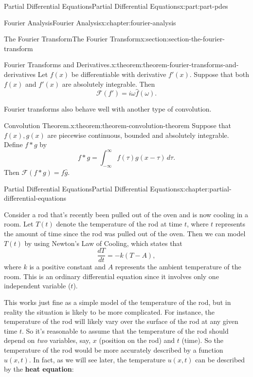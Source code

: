\documentclass[oneside,10pt,]{book}
\newcommand{\terminology}[1]{\textbf{#1}}
\numberwithin{equation}{part}
\begin{document}
\begin{partptx}{Partial Differential Equations}{}{Partial Differential Equations}{}{}{x:part:part-pdes}
\begin{chapterptx}{Fourier Analysis}{}{Fourier Analysis}{}{}{x:chapter:fourier-analysis}
\begin{sectionptx}{The Fourier Transform}{}{The Fourier Transform}{}{}{x:section:section-the-fourier-transform}
\begin{theorem}{Fourier Transforms and Derivatives.}{}{x:theorem:theorem-fourier-transforms-and-derivatives}
%
Let \(f(x)\) be differentiable with derivative \(f'(x)\). Suppose that both \(f(x)\) and \(f'(x)\) are absolutely integrable. Then%
\begin{equation*}
\mathcal{F}(f') = i\omega\hat{f}(\omega).
\end{equation*}
%
\end{theorem}
Fourier transforms also behave well with another type of convolution.%
\begin{theorem}{Convolution Theorem.}{}{x:theorem:theorem-convolution-theorem}%
%
Suppose that \(f(x),g(x)\) are piecewise continuous, bounded and absolutely integrable. Define \(f\ast g\) by%
\begin{equation*}
f\ast g = \int_{-\infty}^{\infty}f(\tau)g(x-\tau)\,d\tau.
\end{equation*}
Then \(\mathcal{F}(f\ast g) = \hat{f}\hat{g}.\)%
\end{theorem}
\end{sectionptx}
\end{chapterptx}
%
\typeout{************************************************}
\typeout{************************************************}
%
\begin{chapterptx}{Partial Differential Equations}{}{Partial Differential Equations}{}{}{x:chapter:partial-differential-equations}
\begin{introduction}{}%
Consider a rod that's recently been pulled out of the oven and is now cooling in a room. Let \(T(t)\) denote the temperature of the rod at time \(t\), where \(t\) represents the amount of time since the rod was pulled out of the oven. Then we can model \(T(t)\) by using Newton's Law of Cooling, which states that%
\begin{equation*}
\frac{dT}{dt} = -k(T-A),
\end{equation*}
where \(k\) is a positive constant and \(A\) represents the ambient temperature of the room. This is an ordinary differential equation since it involves only one independent variable (\(t\)).%
\par
This works just fine as a simple model of the temperature of the rod, but in reality the situation is likely to be more complicated. For instance, the temperature of the rod will likely vary over the surface of the rod at any given time \(t\). So it's reasonable to assume that the temperature of the rod should depend on \emph{two} variables, say, \(x\) (position on the rod) and \(t\) (time). So the temperature of the rod would be more accurately described by a function \(u(x,t)\). In fact, as we will see later, the temperature \(u(x,t)\) can be described by the \terminology{heat equation}:%

\end{introduction}
\end{chapterptx}
\end{partptx}
\end{document}
